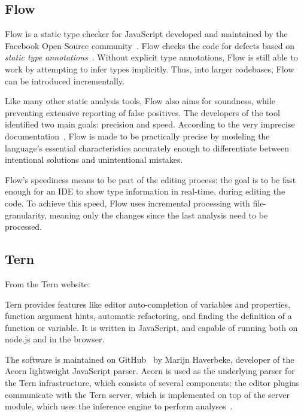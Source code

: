 \subsection{Flow}

Flow is a static type checker for JavaScript developed and maintained by the Facebook Open Source community~\cite{flow-github}. Flow checks the code for defects based on \emph{static type annotations}~\cite{flow-website}. Without explicit type annotations, Flow is still able to work by attempting to infer types implicitly. Thus, into larger codebases, Flow can be introduced incrementally.

Like many other static analysis tools, Flow also aims for soundness, while preventing extensive reporting of false positives. The developers of the tool identified two main goals: precision and speed. According to the very imprecise documentation~\cite{flow-docs}, Flow is made to be practically precise by modeling the language's essential characteristics accurately enough to differentiate between intentional solutions and unintentional mistakes.

Flow's speediness means to be part of the editing process: the goal is to be fast enough for an IDE to show type information in real-time, during editing the code. To achieve this speed, Flow uses incremental processing with file-granularity, meaning only the changes since the last analysis need to be processed.

\subsection{Tern}

From the Tern website: ~\cite{tern-website}

Tern provides features like editor auto-completion of variables and properties, function argument hints, automatic refactoring, and finding the definition of a function or variable. It is written in JavaScript, and capable of running both on node.js and in the browser.

The software is maintained on GitHub~\cite{tern-github} by Marijn Haverbeke, developer of the Acorn lightweight JavaScript parser. Acorn is used as the underlying parser for the Tern infrastructure, which consists of several components: the editor plugins communicate with the Tern server, which is implemented on top of the server module, which uses the inference engine to perform analyses~\cite{tern-website}.

